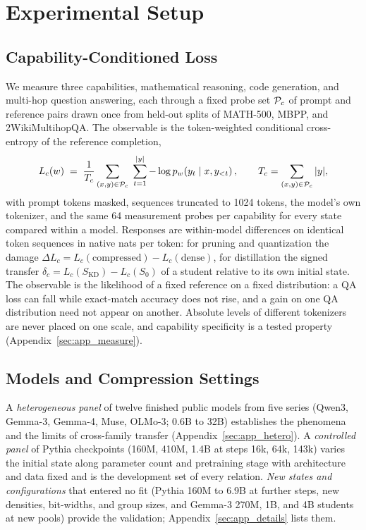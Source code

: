 \section{Experimental Setup}
\label{sec:setup}

\subsection{Capability-Conditioned Loss}
\label{sec:loss}

We measure three capabilities, mathematical reasoning, code generation,
and multi-hop question answering, each through a fixed probe set
$\mathcal{P}_{c}$ of prompt and reference pairs drawn once from held-out
splits of MATH-500, MBPP, and 2WikiMultihopQA. The observable is the
token-weighted conditional cross-entropy of the reference completion,
\begin{equation}
L_{c}(w)\;=\;\frac{1}{T_c}\sum_{(x,y)\in\mathcal{P}_{c}}\;\sum_{t=1}^{|y|}
-\log p_w\!\left(y_t\mid x,y_{<t}\right),\qquad
T_c=\sum_{(x,y)\in\mathcal{P}_{c}}|y|,
\label{eq:taskloss}
\end{equation}
with prompt tokens masked, sequences truncated to 1024 tokens, the
model's own tokenizer, and the same 64 measurement probes per
capability for every state compared within a model. Responses are
within-model differences on identical token sequences in native nats
per token: for pruning and quantization the damage
$\Delta L_c=L_c(\text{compressed})-L_c(\text{dense})$, for distillation
the signed transfer $\delta_c=L_c(S_{\mathrm{KD}})-L_c(S_0)$ of a
student relative to its own initial state. The observable is the
likelihood of a fixed reference on a fixed distribution: a QA loss can
fall while exact-match accuracy does not rise, and a gain on one QA
distribution need not appear on another. Absolute levels of different
tokenizers are never placed on one scale, and capability specificity
is a tested property (Appendix~\ref{sec:app_measure}).

\subsection{Models and Compression Settings}
\label{sec:models}

A \emph{heterogeneous panel} of twelve finished public models from
five series (Qwen3, Gemma-3, Gemma-4, Muse, OLMo-3; 0.6B to 32B)
establishes the phenomena and the limits of cross-family transfer
(Appendix~\ref{sec:app_hetero}). A \emph{controlled panel} of Pythia
checkpoints (160M, 410M, 1.4B at steps 16k, 64k, 143k) varies the
initial state along parameter count and pretraining stage with
architecture and data fixed and is the development set of every
relation. \emph{New states and configurations} that entered no fit
(Pythia 160M to 6.9B at further steps, new densities, bit-widths, and
group sizes, and Gemma-3 270M, 1B, and 4B students at new pools)
provide the validation; Appendix~\ref{sec:app_details} lists them.

